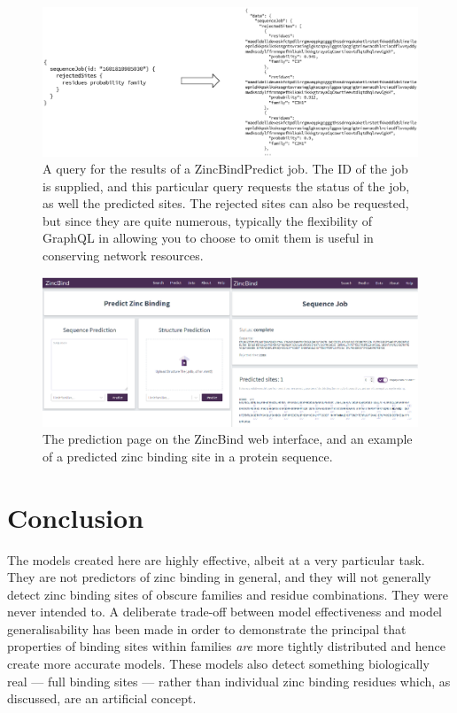 \begin{figure}
\centering
\includegraphics[width=1.0\textwidth]{Figures/zbp-query.eps}
\caption[ZincBindPredict query request.]{\label{fig:zbp-query} A query for the results of a ZincBindPredict job.
The ID of the job is supplied, and this particular query requests the status of
the job, as well the predicted sites. The rejected sites can also be requested,
but since they are quite numerous, typically the flexibility of GraphQL in allowing
you to choose to omit them is useful in conserving network resources.}
\end{figure}

\begin{figure}
\centering
\includegraphics[width=1.0\textwidth]{Figures/prediction-interface.eps}
\caption[The prediction page on the ZincBind web interface.]{\label{fig:prediction-interface} The prediction page on the ZincBind web interface, and an example of a predicted zinc binding site in a protein sequence.}
\end{figure}

\section{Conclusion}

The models created here are highly effective, albeit at a very particular task. They are not predictors of zinc binding in general, and they will not generally detect zinc binding sites of obscure families and residue combinations. They were never intended to. A deliberate trade-off between model effectiveness and model generalisability has been made in order to demonstrate the principal that properties of binding sites within families \emph{are} more tightly distributed and hence create more accurate models. These models also detect something biologically real --- full binding sites --- rather than individual zinc binding residues which, as discussed, are an artificial concept.

